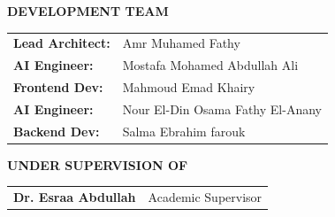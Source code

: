 

\thispagestyle{empty}

\vspace*{\fill}

\begin{center}

\begin{tcolorbox}[
    colback=brandSecondary!5,
    colframe=brandSecondary,
    boxrule=1pt,
    arc=3pt,
    width=0.8\textwidth,
    halign=center
]
\textbf{DEVELOPMENT TEAM}\\[0.5em]
\begin{tabular}{ll}
\textbf{Lead Architect:} & Amr Muhamed Fathy \\
\textbf{AI Engineer:} & Mostafa Mohamed Abdullah Ali \\
\textbf{Frontend Dev:} & Mahmoud Emad Khairy \\
\textbf{AI Engineer:} & Nour El-Din Osama Fathy El-Anany \\
\textbf{Backend Dev:} & Salma Ebrahim farouk \\
\end{tabular}
\end{tcolorbox}

\vspace{1cm}

\begin{tcolorbox}[
    colback=brandTertiary!5,
    colframe=brandTertiary,
    boxrule=1pt,
    arc=3pt,
    width=0.8\textwidth,
    halign=center
]
\textbf{UNDER SUPERVISION OF}\\[0.5em]
\begin{tabular}{ll}
\textbf{Dr. Esraa Abdullah} & Academic Supervisor \\
\end{tabular}
\end{tcolorbox}


\end{center}
